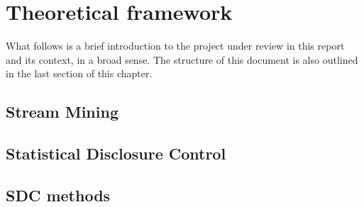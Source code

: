 \chapter{Theoretical framework} %
\label{Chapter2TheoreticalFramework} %


What follows is a brief introduction to the project under review in this report and its context,
in a broad sense. The structure of this document is also outlined in the last section of this chapter.

\section{Stream Mining}
\label{Theory::StreamMining}


\section{Statistical Disclosure Control}
\label{Theory::SDC}


\section{SDC methods}
\label{Theory::SDCMethods}
